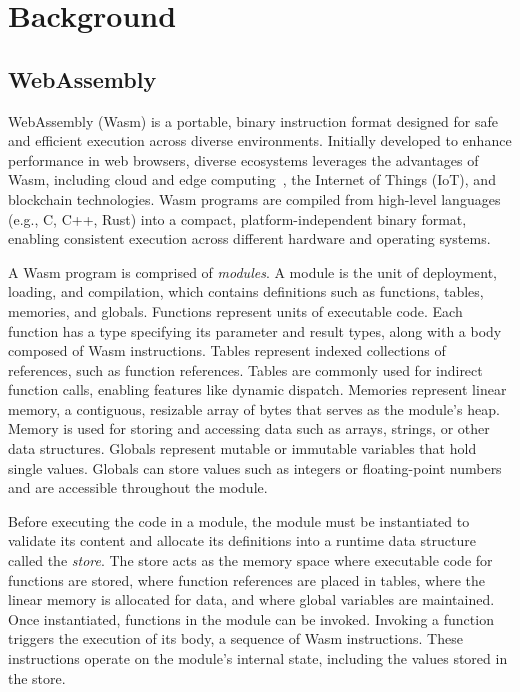 
\chapter{Background} \label{ch:background} \noindent

\section{WebAssembly} \label{sec:webassembly}

WebAssembly (Wasm) is a portable, binary instruction format designed for safe
and efficient execution across diverse environments.
Initially developed to enhance performance in web browsers, diverse ecosystems
leverages the advantages of Wasm, including cloud and edge
computing~\cite{lucet, cloudflare}, the Internet of Things (IoT)\cite{wasm-iot}, and
blockchain technologies\cite{wasm-blockchain}.
Wasm programs are compiled from high-level languages (e.g., C, C++, Rust) into
a compact, platform-independent binary format, enabling consistent execution
across different hardware and operating systems.

A Wasm program is comprised of \textit{modules}.
A module is the unit of deployment, loading, and compilation, which contains
definitions such as functions, tables, memories, and globals.
Functions represent units of executable code.
Each function has a type specifying its parameter and result types, along with
a body composed of Wasm instructions.
Tables represent indexed collections of references, such as function
references.
Tables are commonly used for indirect function calls, enabling features like
dynamic dispatch.
Memories represent linear memory, a contiguous, resizable array of bytes that
serves as the module’s heap.
Memory is used for storing and accessing data such as arrays, strings, or other
data structures.
Globals represent mutable or immutable variables that hold single values.
Globals can store values such as integers or floating-point numbers and are
accessible throughout the module.


Before executing the code in a module, the module must be instantiated to
validate its content and allocate its definitions into a runtime data structure
called the \textit{store}.
The store acts as the memory space where executable code for functions are
stored, where function references are placed in tables, where the linear memory
is allocated for data, and where global variables are maintained.
Once instantiated, functions in the module can be invoked.
Invoking a function triggers the execution of its body, a sequence of
Wasm instructions.
These instructions operate on the module’s internal state, including the values
stored in the store.


